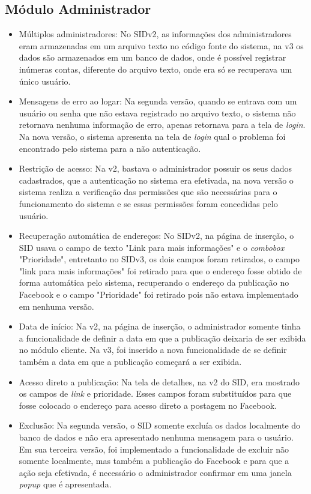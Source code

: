 \subsection{Módulo Administrador}
    \begin{itemize}
        \item Múltiplos administradores: No SIDv2, as informações dos administradores eram armazenadas em um arquivo texto no código fonte do sistema, na v3 os dados são armazenados em um banco de dados, onde é possível registrar inúmeras contas, diferente do arquivo texto, onde era só se recuperava um único usuário.

        \item Mensagens de erro ao logar: Na segunda versão, quando se entrava com um usuário ou senha que não estava registrado no arquivo texto, o sistema não retornava nenhuma informação de erro, apenas retornava para a tela de \textit{login}. Na nova versão, o sistema apresenta na tela de \textit{login} qual o problema foi encontrado pelo sistema para a não autenticação.

        \item Restrição de acesso: Na v2, bastava o administrador possuir os seus dados cadastrados, que a autenticação no sistema era efetivada, na nova versão o sistema realiza a verificação das permissões que são necessárias para o funcionamento do sistema e se essas permissões foram concedidas pelo usuário.

        \item Recuperação automática de endereços: No SIDv2, na página de inserção, o SID usava o campo de texto "Link para mais informações" e o \textit{combobox} "Prioridade", entretanto no SIDv3, os dois campos foram retirados, o campo "link para mais informações" foi retirado para que o endereço fosse obtido de forma automática pelo sistema, recuperando o endereço da publicação no Facebook e o campo "Prioridade" foi retirado pois não estava implementado em nenhuma versão.

        \item Data de início: Na v2, na página de inserção, o administrador somente tinha a funcionalidade de definir a data em que a publicação deixaria de ser exibida no módulo cliente. Na v3, foi inserido a nova funcionalidade de se definir também a data em que a publicação começará a ser exibida.
        
        \item Acesso direto a publicação: Na tela de detalhes, na v2 do SID, era mostrado os campos de \textit{link} e prioridade. Esses campos foram substituídos para que fosse colocado o endereço para acesso direto a postagem no Facebook.
        
        \item Exclusão: Na segunda versão, o SID somente excluía os dados localmente do banco de dados e não era apresentado nenhuma mensagem para o usuário. Em sua terceira versão, foi implementado a funcionalidade de excluir não somente localmente, mas também a publicação do Facebook e para que a ação seja efetivada, é necessário o administrador confirmar em uma janela \textit{popup} que é apresentada. 
    \end{itemize}
